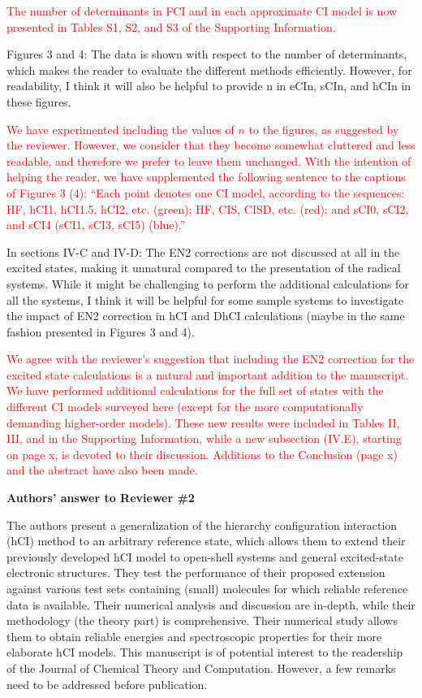 \documentclass[10pt]{letter}
\newcommand{\alert}[1]{\textcolor{red}{#1}}
\begin{document}
\begin{letter}
\alert{
The number of determinants in FCI and in each approximate CI model is now presented in Tables S1, S2, and S3 of the Supporting Information.
}

{Figures 3 and 4: The data is shown with respect to the number of determinants, which makes the
reader to evaluate the different methods efficiently. However, for readability, I think it will also be
helpful to provide n in eCIn, sCIn, and hCIn in these figures.
}

\alert{
We have experimented including the values of $n$ to the figures, as suggested by the reviewer.
However, we consider that they become somewhat cluttered and less readable, and therefore we prefer to leave them unchanged.
With the intention of helping the reader, we have supplemented the following sentence to the captions of Figures 3 (4):
``Each point denotes one CI model, according to the sequences: HF, hCI1, hCI1.5, hCI2, etc. (green); HF, CIS, CISD, etc. (red); and sCI0, sCI2, and sCI4 (sCI1, sCI3, sCI5) (blue).''
}

{In sections IV-C and IV-D: The EN2 corrections are not discussed at all in the excited states, making
it unnatural compared to the presentation of the radical systems. While it might be challenging to
perform the additional calculations for all the systems, I think it will be helpful for some sample
systems to investigate the impact of EN2 correction in hCI and DhCI calculations (maybe in the
same fashion presented in Figures 3 and 4).
}

\alert{
We agree with the reviewer's suggestion that including the EN2 correction for the excited state calculations is a natural and important addition to the manuscript.
We have performed additional calculations for the full set of states with the different CI models surveyed here (except for the more computationally demanding higher-order models).
These new results were included in Tables II, III, and in the Supporting Information, while a new subsection (IV.E), starting on page x, is devoted to their discussion.
Additions to the Conclusion (page x) and the abstract have also been made.
}

\clearpage

\noindent \textbf{\large Authors' answer to Reviewer \#2}

{The authors present a generalization of the hierarchy configuration interaction (hCI) method to an arbitrary reference state, which allows them to extend their previously developed hCI model to open-shell systems and general excited-state electronic structures. They test the performance of their proposed extension against various test sets containing (small) molecules for which reliable reference data is available. Their numerical analysis and discussion are in-depth, while their methodology (the theory part) is comprehensive. Their numerical study allows them to obtain reliable energies and spectroscopic properties for their more elaborate hCI models. This manuscript is of potential interest to the readership of the Journal of Chemical Theory and Computation. However, a few remarks need to be addressed before publication.
}


\end{letter}
\end{document}
